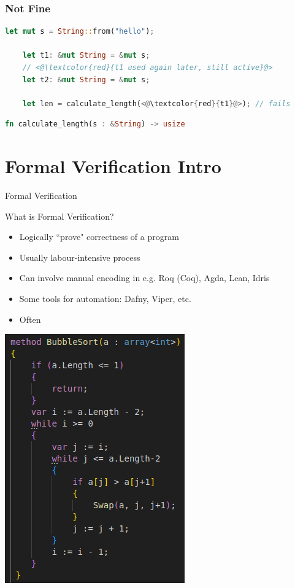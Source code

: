 \documentclass{beamer}
\begin{document}
\begin{frame}[fragile]
\frametitle{Not Fine}
\begin{block}{}
\begin{lstlisting}[language=Rust]
    let mut s = String::from("hello");
    
    let t1: &mut String = &mut s;
    // <@\textcolor{red}{t1 used again later, still active}@>
    let t2: &mut String = &mut s;

    let len = calculate_length(<@\textcolor{red}{t1}@>); // fails
 \end{lstlisting}
\end{block}
\begin{lstlisting}[language=Rust]
fn calculate_length(s : &String) -> usize
\end{lstlisting}
\end{frame}


\section{Formal Verification Intro}
\begin{frame}{Formal Verification}
\begin{block}{What is Formal Verification?}
\begin{itemize} 
	\item Logically ``prove" correctness of a program
	\item Usually labour-intensive process
	\item Can involve manual encoding in e.g. Roq (Coq), Agda, Lean, Idris
	\item Some tools for automation: Dafny, Viper, etc.
	\item Often 
\end{itemize} 
\end{block}
\end{frame}




\begin{frame}
\includegraphics[scale=0.6]{pictures/verification/bubblesort.png}
\end{frame}
\end{document}

